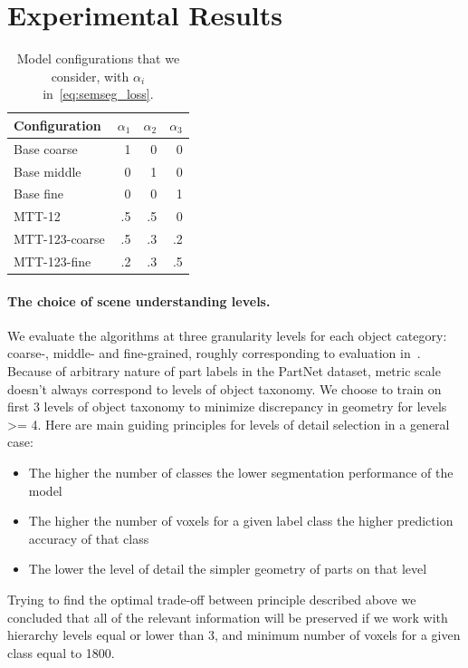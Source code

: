 \section{Experimental Results}
\label{sec:results}

\begin{table}
\caption{Model configurations that we consider, with $\alpha_i$ in~\eqref{eq:semseg_loss}.}
\begin{tabular}{lrrr}\\\toprule  
Configuration   & $\alpha_1$ & $\alpha_2$ & $\alpha_3$ \\
\midrule
Base coarse     & 1 & 0 & 0 \\
Base middle     & 0 & 1 & 0 \\
Base fine       & 0 & 0 & 1 \\
MTT-12          & .5 & .5 &  0 \\
MTT-123-coarse  & .5 & .3 & .2 \\
MTT-123-fine    & .2 & .3 & .5 \\
\bottomrule
\end{tabular}
\label{table:configurations}
\end{table} 

\paragraph{The choice of scene understanding levels. }
\label{results:levels}
We evaluate the algorithms at three granularity levels for each object category: coarse-, middle- and fine-grained, roughly corresponding to evaluation in~\cite{mo2019partnet}. 
Because of arbitrary nature of part labels in the PartNet dataset, metric scale doesn't always correspond to levels of object taxonomy. We choose to train on first 3 levels of object taxonomy to minimize discrepancy in geometry for levels >= 4.
Here are main guiding principles for levels of detail selection in a general case:
\begin{itemize}
    \item The higher the number of classes the lower segmentation performance of the model
    \item The higher the number of voxels for a given label class the higher prediction accuracy of that class
    \item The lower the level of detail the simpler geometry of parts on that level 
\end{itemize}

Trying to find the optimal trade-off between principle described above we concluded that all of the relevant information will be preserved if we work with hierarchy levels equal or lower than 3, and minimum number of voxels for a given class equal to 1800.

